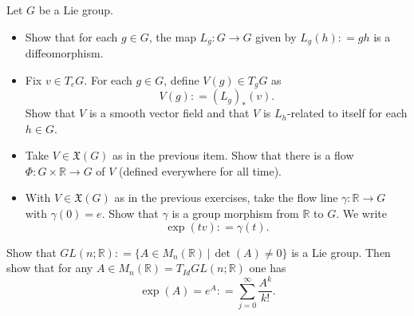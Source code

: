 \documentclass{ximera}
\begin{document}
\begin{exercise}
 Let $G$ be a Lie group.
\begin{itemize}
    \item Show that for each $g \in G$, the map $L_g : G \to G$ given by $L_g(h) : = gh$ is a diffeomorphism.
    \item Fix $v \in T_eG$. For each $g \in G$, define $V(g) \in T_gG$ as 
    \[ V(g) : = (L_g)_{\ast}(v).\] 
    Show that $V$ is a smooth vector field and that $V$ is $L_h$-related to itself for each $h \in G$. 
    \item Take $V \in \mathfrak{X}(G)$ as in the previous item. Show that there is a flow  $\Phi : G \times \mathbb{R} \to G$ of $V$  (defined everywhere for all time).
    \item With $V\in \mathfrak{X}(G)$ as in the previous exercises, take the flow line $\gamma : \mathbb{R} \to G$ with $\gamma (0) = e$. Show that $\gamma $ is a group morphism from $\mathbb{R} $ to $G$. We write
    \[  \exp (t v) : = \gamma (t) .                    \]
\end{itemize}
\end{exercise}

\begin{exercise}
    Show that $GL(n;\mathbb{R}) : = \{ A \in M_n (\mathbb{R}) \, \vert \, \det (A) \neq 0 \} $ is a Lie group. Then show that for any $A \in M_n(\mathbb{R}) = T_{Id} GL(n; \mathbb{R})$ one has 
        \[      \exp ( A ) =  e ^A :  = \sum_{j = 0 }^{\infty} \frac{A^k}{k!} .      \]
\end{exercise}
\end{document}
